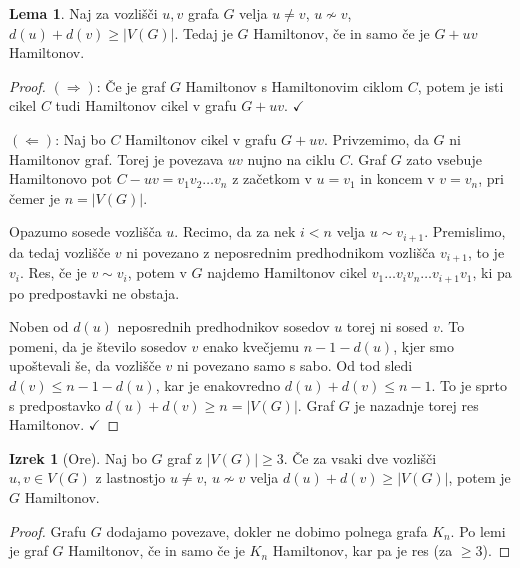 \documentclass[11pt]{book}
\def\kljuka{$\checkmark$}
\theoremstyle{definition}
\theoremstyle{zgled}
\theoremstyle{odprtproblem}
\theoremstyle{domacanaloga}
\newenvironment{dokaz}
    {\color{siva}\begin{proof}}
    {\end{proof}}
\theoremstyle{izrek}
\newtheorem*{izrek}{Izrek}
\newtheorem*{lema}{Lema}
\begin{document}
\begin{lema}
    Naj za vozlišči $u,v$ grafa $G$ velja $u \neq v$, $u \not\sim v$, $d(u) + d(v) \geq |V(G)|$. Tedaj je $G$ Hamiltonov, če in samo če je $G + uv$ Hamiltonov.
\end{lema}
\begin{dokaz}
$(\Rightarrow)$: Če je graf $G$ Hamiltonov s Hamiltonovim ciklom $C$, potem je isti cikel $C$ tudi Hamiltonov cikel v grafu $G + uv$. \kljuka

$(\Leftarrow)$: Naj bo $C$ Hamiltonov cikel v grafu $G + uv$. Privzemimo, da $G$ ni Hamiltonov graf. Torej je povezava $uv$ nujno na ciklu $C$. Graf $G$ zato vsebuje Hamiltonovo pot $C - uv = v_1 v_2 \dots v_n$ z začetkom v $u = v_1$ in koncem v $v = v_n$, pri čemer je $n = |V(G)|$.

Opazumo sosede vozlišča $u$. Recimo, da za nek $i < n$ velja $u \sim v_{i+1}$. Premislimo, da tedaj vozlišče $v$ ni povezano z neposrednim predhodnikom vozlišča $v_{i+1}$, to je $v_i$. Res, če je $v \sim v_i$, potem v $G$ najdemo Hamiltonov cikel $v_1 \dots v_i v_n \dots v_{i+1} v_1$, ki pa po predpostavki ne obstaja.

Noben od $d(u)$ neposrednih predhodnikov sosedov $u$ torej ni sosed $v$. To pomeni, da je število sosedov $v$ enako kvečjemu $n - 1 - d(u)$, kjer smo upoštevali še, da vozlišče $v$ ni povezano samo s sabo. Od tod sledi $d(v) \leq n - 1 - d(u)$, kar je enakovredno $d(u) + d(v) \leq n -1$. To je sprto s predpostavko $d(u) + d(v) \geq n = |V(G)|$. Graf $G$ je nazadnje torej res Hamiltonov. \kljuka
\end{dokaz}

\begin{izrek}[Ore]
    Naj bo $G$ graf z $|V(G)| \geq 3$. Če za vsaki dve vozlišči $u,v \in V(G)$ z lastnostjo $u \neq v$, $u \not\sim v$ velja $d(u) + d(v) \geq |V(G)|$, potem je $G$ Hamiltonov.
\end{izrek}
\begin{dokaz}
Grafu $G$ dodajamo povezave, dokler ne dobimo polnega grafa $K_n$. Po lemi je graf $G$ Hamiltonov, če in samo če je $K_n$ Hamiltonov, kar pa je res (za $\geq 3$).
\end{dokaz}
\end{document}
